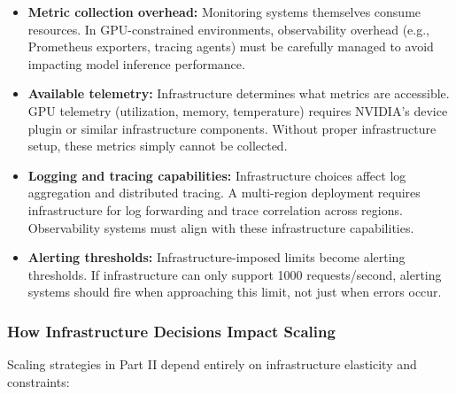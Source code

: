 \begin{itemize}
    \item \textbf{Metric collection overhead:} Monitoring systems themselves consume resources. In GPU-constrained environments, observability overhead (e.g., Prometheus exporters, tracing agents) must be carefully managed to avoid impacting model inference performance.
    
    \item \textbf{Available telemetry:} Infrastructure determines what metrics are accessible. GPU telemetry (utilization, memory, temperature) requires NVIDIA's device plugin or similar infrastructure components. Without proper infrastructure setup, these metrics simply cannot be collected.
    
    \item \textbf{Logging and tracing capabilities:} Infrastructure choices affect log aggregation and distributed tracing. A multi-region deployment requires infrastructure for log forwarding and trace correlation across regions. Observability systems must align with these infrastructure capabilities.
    
    \item \textbf{Alerting thresholds:} Infrastructure-imposed limits become alerting thresholds. If infrastructure can only support 1000 requests/second, alerting systems should fire when approaching this limit, not just when errors occur.
\end{itemize}

\subsubsection{How Infrastructure Decisions Impact Scaling}

Scaling strategies in Part II depend entirely on infrastructure elasticity and constraints:

